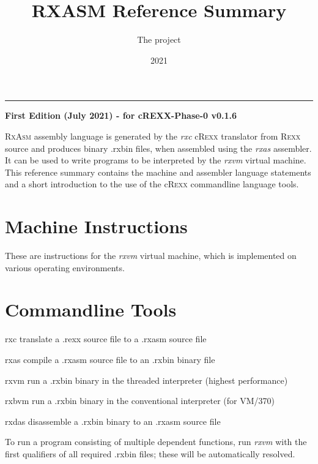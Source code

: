 \documentclass[10pt]{article}
\title{\fontspec{Helvetica}\textbf{RXASM Reference Summary}}
\author{The \cRexx{} project}
\date{2021}
\makeatletter
\renewcommand{\maketitle}{%
{\begin{center}\Large \mythetitle\end{center}}
}
\newcommand{\cRexx}{cR\textsc{exx}}
\newcommand{\Rexx}{R\textsc{exx}}
\newcommand{\RxAsm}{R\textsc{xAsm}}
\let\mcnewpage=\newpage
\newcommand{\TrickSupertabularIntoMulticols}{%
  \renewcommand\newpage{%
    \if@firstcolumn
      \hrule width\linewidth height0pt
      \columnbreak
    \else
      \mcnewpage
    \fi
  }%
}
\makeatother
\begin{document}
\begin{multicols}{3}
  \TrickSupertabularIntoMulticols
  \lstset{language=rxas}
  \lstset{basicstyle=\ttfamily}
\hspace*{4cm}  \maketitle


  \vspace*{3cm}
\hspace*{-1.5cm}\rule{9.95cm}{1cm}




  
\hrulefill 

\textbf{First Edition (July 2021) - for cREXX-Phase-0 v0.1.6}


\tableofcontents
\hrulefill

\RxAsm{} assembly language is generated by the \emph{rxc} \cRexx{} translator from
\Rexx{} source and produces binary .rxbin files, when
assembled using the \emph{rxas} assembler. It can be used to write
programs to be interpreted by the \emph{rxvm} virtual machine. This
reference summary contains the machine and assembler language statements and a
short introduction to the use of the \cRexx{} commandline language tools.

\section{ Machine Instructions}
These are instructions for the \emph{rxvm} virtual machine, which is 
implemented on various operating environments.

\raggedright
\begin{ttdesc}[labelwidth=\widthof{\ttfamily{letterpaper/a4paper}}]

\end{ttdesc}
\section{ Commandline Tools}
\raggedright
\begin{ttdesc}[labelwidth=\widthof{\ttfamily{letterpaper/a4paper}}]
\item[rxc]  translate a .rexx source file to a .rxasm source file
\item[rxas]  compile a .rxasm source file to an .rxbin binary file
\item[rxvm] run a .rxbin binary in the threaded interpreter (highest performance)
\item[rxbvm] run a .rxbin binary in the conventional interpreter (for
  VM/370)
\item[rxdas] disassemble a .rxbin binary to an .rxasm source file
\end{ttdesc}
To run a program consisting of multiple dependent functions, run
\emph{rxvm} with the first qualifiers of all required .rxbin files;
these will be automatically resolved.


\end{multicols}
\end{document}

